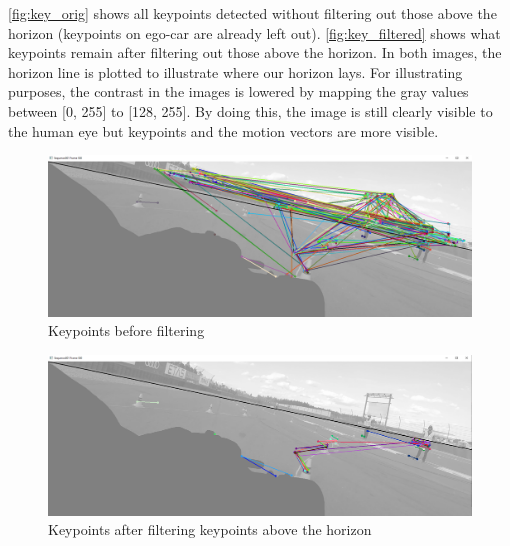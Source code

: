 \autoref{fig:key_orig} shows all keypoints detected without filtering out those above the horizon (keypoints on ego-car are already left out). \autoref{fig:key_filtered} shows what keypoints remain after filtering out those above the horizon. In both images, the horizon line is plotted to illustrate where our horizon lays. For illustrating purposes, the contrast in the images is lowered by mapping the gray values between [0, 255] to [128, 255]. By doing this, the image is still clearly visible to the human eye but keypoints and the motion vectors are more visible.

\begin{figure}
    \centering
    \includegraphics[width=1\textwidth]{figures/keypoint_orig.png}
    \caption{Keypoints before filtering}
    \label{fig:key_orig}
\end{figure}
\begin{figure}
    \centering
    \includegraphics[width=1\textwidth]{figures/keypoint_filtered.png}
    \caption{Keypoints after filtering keypoints above the horizon}
    \label{fig:key_filtered}
\end{figure}

